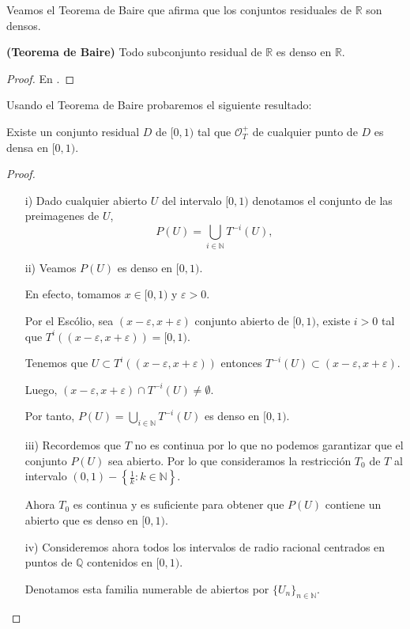 Veamos el Teorema de Baire que afirma que los conjuntos residuales de $\mathbb{R}$ son densos.
\begin{teo}
\textbf{(Teorema de Baire)} Todo subconjunto residual de $\mathbb{R}$ es denso en $\mathbb{R}$. 
\end{teo}
\begin{proof}
En \cite{Portugues}.
\end{proof}

Usando el Teorema de Baire probaremos el siguiente resultado:

\begin{prop}
Existe un conjunto residual $D$ de $[0,1)$ tal que $\mathcal{O}_{T}^{+}$ de cualquier punto de $D$ es densa en $[0,1)$.
\end{prop}
\begin{proof}\hfill
\begin{itemize}
    \item[i)] Dado cualquier abierto $U$ del intervalo $[0,1)$ denotamos el conjunto de las preimagenes de $U$,
    $$
    P(U)=\displaystyle\bigcup_{i\in\mathbb{N}}T^{-i}(U),
    $$
    \item[ii)] Veamos $P(U)$ es denso en $[0,1)$.
    
    En efecto, tomamos $x\in[0,1)$ y $\varepsilon>0$. 
    
    Por el Escólio, sea $(x-\varepsilon,x+\varepsilon)$ conjunto abierto de $[0,1)$, existe $i>0$ tal que $T^{i}((x-\varepsilon,x+\varepsilon))=[0,1)$.
    
    Tenemos que $U\subset T^{i}((x-\varepsilon,x+\varepsilon))$ entonces $T^{-i}(U)\subset(x-\varepsilon,x+\varepsilon)$.
    
    Luego, $(x-\varepsilon,x+\varepsilon)\cap T^{-i}(U)\neq\emptyset$.
    
    Por tanto, $P(U)=\displaystyle\bigcup_{i\in\mathbb{N}}T^{-i}(U)$ es denso en $[0,1)$.
    \item[iii)] Recordemos que $T$ no es continua por lo que no podemos garantizar que el conjunto $P(U)$ sea abierto. Por lo que consideramos la restricción $T_{0}$ de $T$ al intervalo $(0,1)-\left\{\frac{1}{k}:k\in\mathbb{N}\right\}$.
    
    Ahora $T_{0}$ es continua y es suficiente para obtener que $P(U)$ contiene un abierto que es denso en $[0,1)$.
    \item[iv)] Consideremos ahora todos los intervalos de radio racional centrados en puntos de $\mathbb{Q}$ contenidos en $[0,1)$.
    
    Denotamos esta familia numerable de abiertos por $\{U_{n}\}_{n\in\mathbb{N}}$.
    

\end{itemize}
\end{proof}
